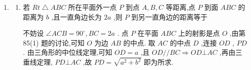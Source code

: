 \begin{enumerate}
\begin{enumerate}
\begin{jieda}
          \end{jieda}
          \item 在棱长为 $a$ 的正方体 ${ABCD} - {A}_{1}{B}_{1}{C}_{1}{D}_{1}$ 中, ${D}_{1}$ 到 ${B}_{1}C$ 的距离为, $A$ 到 ${A}_{1}C$ 的距离为
          \begin{jieda}
              $\bigtriangleup {D}_{1}{B}_{1}C$ 是边长为 $\sqrt{2}a$ 的等边三角形,故 ${D}_{1}$ 到 ${B}_{1}C$ 的距离为 $\dfrac{\sqrt{3}}{2} \cdot  \sqrt{2}a = \dfrac{\sqrt{6}}{2}a.\operatorname{Rt} \bigtriangleup  {A}_{1}{AC}$ 中, $\angle {A}_{1}{AC} = {90}^{ \circ  }$ ,由面积法 (或相似三角形), $A$ 到 ${A}_{1}C$ 的距离为 $\dfrac{A{A}_{1} \cdot  {AC}}{{A}_{1}C} = \dfrac{a \cdot  \sqrt{2}a}{\sqrt{3}a} = \dfrac{\sqrt{6}}{3}a.$
          \end{jieda}
          \item 在菱形 ${ABCD}$ 中,已知 $\angle {BAD} = {60}^{ \circ  },{AB} = {10}{{cm}},{PA}\bot$ 菱形 ${ABCD}$ 所在平面,且 ${PA} = {5{{cm}}}$ ,则 $P$ 到 ${BD}$ 的距离为 ${{cm}}$ , $P$ 到 ${DC}$ 的距离为 ${{cm}}$
          \begin{jieda}
              连接 ${AC},{BD}$ 交于点 $E$ ,连接 ${PE}.{AE}$ 是 ${PE}$ 在平面 ${ABCD}$ 上的射影,由三垂线定理, ${BD}\bot {AE} \Longrightarrow  {BD}$  $\bot {PE}.\bigtriangleup {ABD}$ 是等边三角形,故 ${AE} = 5\sqrt{3}{{cm}},P$ 到 ${BD}$ 的距离 ${PE} = \sqrt{A{P}^{2} + A{E}^{2}} = {10}{{cm}}$ . 作 ${AF}\bot {CD}$ 延长线于点 $F$ ,连接 ${PF}.{AF}$ 是 ${PF}$ 在平面 ${ABCD}$ 上的射影,由三垂线定理, ${AF} \bot  {CD} \Longrightarrow  {PF} \bot  {CD}$ . 不难求得, ${AF} = {AE} = 5\sqrt{3}$  ${{cm}}$ ,故 $P$ 到 ${DC}$ 的距离 ${PF} = {PE} = {10}{{cm}}$ .
          \end{jieda}
      \end{enumerate}
      \item \begin{enumerate}
          \item 若 ${{Rt}}\bigtriangleup {ABC}$ 所在平面外一点 $P$ 到点 $A,B,C$ 等距离,点 $P$ 到面 ${ABC}$ 的距离为 $b$ ,且一直角边长为 ${2a}$ ,则 $P$ 到另一直角边的距离等于
          \begin{jieda}
              不妨设 $\angle {ACB} = {90}^{ \circ  },{BC} = {2a}$ . 点 $P$ 在平面 ${ABC}$ 上的射影是点 $O$ ,由第 85(1) 题的讨论,可知 $O$ 为边 ${AB}$ 的中点. 取 ${AC}$ 的中点 $D$ ,连接 ${OD}$ , ${PD}$ . 由三角形的中位线定理,可知 ${OD} = a$ ,且 ${OD}//{BC} \Longrightarrow  {OD} \bot  {AC}$ ,再由三垂线定理, ${PD} \bot  {AC}$ ,故 ${PD} = \sqrt{{a}^{2} + {b}^{2}}$ 即为所求.

\end{jieda}
\end{enumerate}
\end{enumerate}

